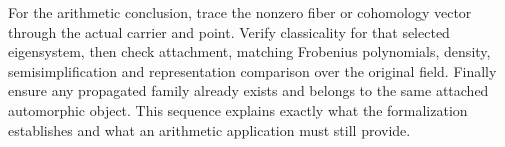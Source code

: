 \documentclass[11pt]{article}
\begin{document}
For the arithmetic conclusion, trace the nonzero fiber or cohomology vector through the actual carrier and point. Verify classicality for that selected eigensystem, then check attachment, matching Frobenius polynomials, density, semisimplification and representation comparison over the original field. Finally ensure any propagated family already exists and belongs to the same attached automorphic object. This sequence explains exactly what the formalization establishes and what an arithmetic application must still provide.
\end{document}
